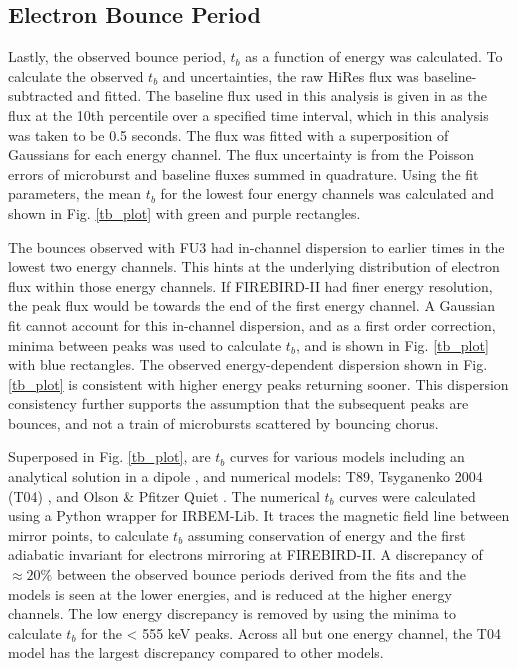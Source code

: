 \documentclass[draft, linenumbers]{agujournal}
\begin{document}
\subsection{Electron Bounce Period} \label{t_b} %
Lastly, the observed bounce period, $t_b$ as a function of energy was calculated. To calculate the observed $t_b$ and uncertainties, the raw HiRes flux was baseline-subtracted and fitted. The baseline flux used in this analysis is given in \citet{O'Brien2004} as the flux at the 10th percentile over a specified time interval, which in this analysis was taken to be 0.5 seconds. The flux was fitted with a superposition of Gaussians for each energy channel. The flux uncertainty is from the Poisson errors of microburst and baseline fluxes summed in quadrature. Using the fit parameters, the mean $t_b$ for the lowest four energy channels was calculated and shown in Fig. \ref{tb_plot} with green and purple rectangles. 

The bounces observed with FU3 had in-channel dispersion to earlier times in the lowest two energy channels. This hints at the underlying distribution of electron flux within those energy channels. If FIREBIRD-II had finer energy resolution, the peak flux would be towards the  end of the first energy channel. A Gaussian fit cannot account for this in-channel dispersion, and as a first order correction, minima between peaks was used to calculate $t_b$, and is shown in Fig. \ref{tb_plot} with blue rectangles. The observed energy-dependent dispersion shown in Fig. \ref{tb_plot} is consistent with higher energy peaks returning sooner. This dispersion consistency further supports the assumption that the subsequent peaks are bounces, and not a train of microbursts scattered by bouncing chorus.

Superposed in Fig. \ref{tb_plot}, are $t_b$ curves for various models including an analytical solution in a dipole \citep{Schulz1974}, and numerical models: T89, Tsyganenko 2004 (T04) \citep{Tsyganenko2005}, and Olson \& Pfitzer Quiet \citep{Olson1982}. The numerical $t_b$ curves were calculated using a Python wrapper for IRBEM-Lib. It traces the magnetic field line between mirror points, to calculate $t_b$ assuming conservation of energy and the first adiabatic invariant for electrons mirroring at FIREBIRD-II. A discrepancy of ${\approx} 20 \%$ between the observed bounce periods derived from the fits and the models is seen at the lower energies, and is reduced at the higher energy channels. The low energy discrepancy is removed by using the minima to calculate $t_b$ for the < 555 keV peaks. Across all but one energy channel, the T04 model has the largest discrepancy compared to other models.
\end{document}
